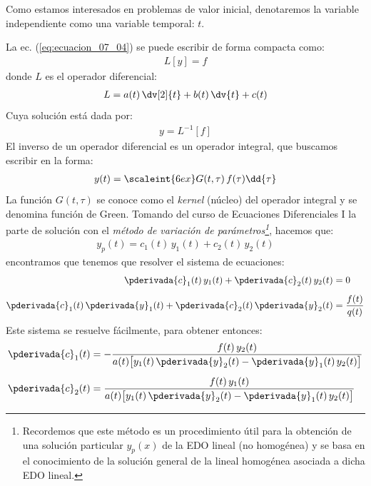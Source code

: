 Como estamos interesados en problemas de valor inicial, denotaremos la variable independiente como una variable temporal: $t$.
\par
La ec. (\ref{eq:ecuacion_07_04}) se puede escribir de forma compacta como:
\begin{align*}
L [y] = f
\end{align*}
donde $L$ es el operador diferencial:
\begin{align*}
L = a (t) \, \dv[2]{t} + b (t) \, \dv{t} + c (t) 
\end{align*}
Cuya solución está dada por:
\begin{align*}
y = L^{-1} [f]
\end{align*}
El inverso de un operador diferencial es un operador integral, que buscamos escribir en la forma:
\begin{align*}
y (t) = \scaleint{6ex} G (t, \tau) \, f(\tau) \dd{\tau}
\end{align*}
La función $G (t, \tau)$ se conoce como el  \emph{kernel} (núcleo) del operador integral y  se denomina función de Green.
\newpage
Tomando del curso de Ecuaciones Diferenciales I la parte de solución con el \emph{método de variación de parámetros\footnote{Recordemos que este método es un procedimiento útil para la obtención de una solución particular $y_{p} (x)$ de la EDO lineal (no homogénea) y se basa en el conocimiento de la solución general de la lineal homogénea asociada a dicha EDO lineal.}}, hacemos que:
\begin{align}
y_{p} (t) = c_{1} (t) \, y_{1} (t) + c_{2} (t) \, y_{2} (t)
\label{eq:ecuacion_07_05}
\end{align}
encontramos que tenemos que resolver el sistema de ecuaciones:
\begin{align}
\begin{aligned}[b]
\pderivada{c}_{1} (t) \, y_{1} (t) + \pderivada{c}_{2} (t) \, y_{2} (t) &= 0 \\[0.5em]
\pderivada{c}_{1} (t) \, \pderivada{y}_{1} (t) + \pderivada{c}_{2} (t) \, \pderivada{y}_{2} (t) &= \dfrac{f (t)}{q (t)}
\end{aligned}
\label{eq:ecuacion_07_06}
\end{align}
Este sistema se resuelve fácilmente, para obtener entonces:
\begin{align}
\begin{aligned}[b]
\pderivada{c}_{1} (t) &= - \dfrac{f (t) \, y_{2} (t)}{a (t) \big[ y_{1} (t) \, \pderivada{y}_{2} (t)  - \pderivada{y}_{1} (t) \, y_{2} (t) \big]} \\[0.5em]
\pderivada{c}_{2} (t) &= \dfrac{f (t) \, y_{1} (t)}{a (t) \big[ y_{1} (t) \, \pderivada{y}_{2} (t)  - \pderivada{y}_{1} (t) \, y_{2} (t) \big]}
\end{aligned}
\label{eq:ecuacion_07_07}
\end{align}
